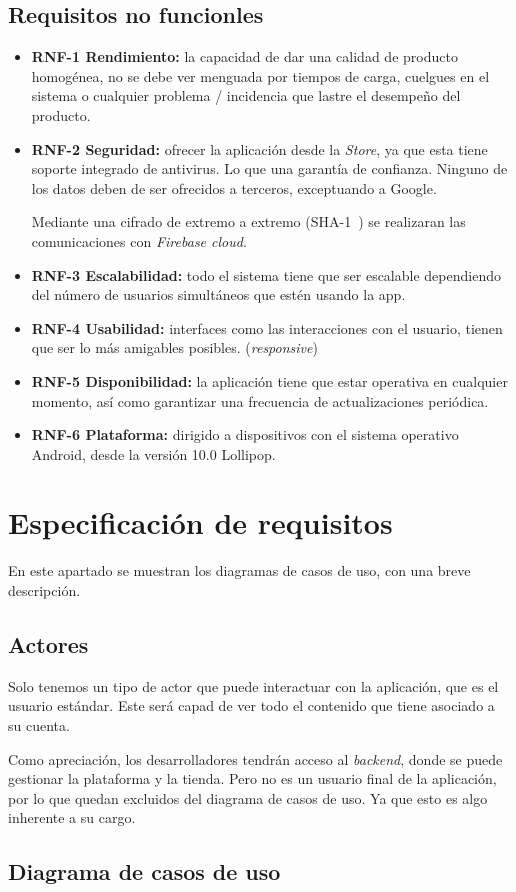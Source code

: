 \subsection{Requisitos no funcionles}
\begin{itemize}
	\tightlist
	\item \textbf{RNF-1 Rendimiento:} la capacidad de dar una calidad de producto homogénea, no se debe ver menguada por tiempos de carga, cuelgues en el sistema o cualquier problema / incidencia que lastre el desempeño del producto.
	\item \textbf{RNF-2 Seguridad:} ofrecer la aplicación desde la \emph{Store}, ya que esta tiene soporte integrado de antivirus. Lo que una garantía de confianza. Ninguno de los datos deben de ser ofrecidos a terceros, exceptuando a Google. 
	
	Mediante una cifrado de extremo a extremo (SHA-1~\cite{wiki:sha1}) se realizaran las comunicaciones con \emph{Firebase cloud}.
	
	\item \textbf{RNF-3 Escalabilidad:} todo el sistema tiene que ser escalable dependiendo del número de usuarios simultáneos que estén usando la app.
	\item \textbf{RNF-4 Usabilidad:} interfaces como las interacciones con el usuario, tienen que ser lo más amigables posibles. (\emph{responsive})
	\item \textbf{RNF-5 Disponibilidad:} la aplicación tiene que estar operativa en cualquier momento, así como garantizar una frecuencia de actualizaciones periódica.
	\item \textbf{RNF-6 Plataforma:} dirigido a dispositivos con el sistema operativo Android, desde la versión 10.0 Lollipop.
\end{itemize}

\section{Especificación de requisitos}
En este apartado se muestran los diagramas de casos de uso, con una breve descripción.

\subsection{Actores}
Solo tenemos un tipo de actor que puede interactuar con la aplicación, que es el usuario estándar. Este será capad de ver todo el contenido que tiene asociado a su cuenta.

Como apreciación, los desarrolladores tendrán acceso al \emph{backend}, donde se puede gestionar la plataforma y la tienda. Pero no es un usuario final de la aplicación, por lo que quedan excluidos del diagrama de casos de uso. Ya que esto es algo inherente a su cargo.

\subsection{Diagrama de casos de uso}